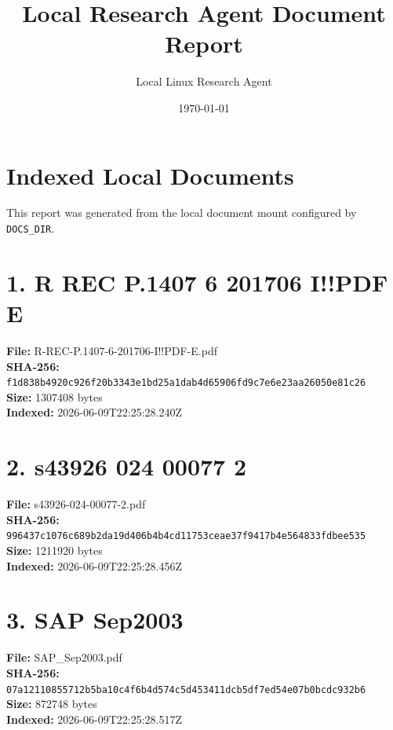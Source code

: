 \documentclass[11pt,a4paper]{article}
\title{Local Research Agent Document Report}
\author{Local Linux Research Agent}
\date{\today}
\begin{document}
\maketitle

\section*{Indexed Local Documents}
This report was generated from the local document mount configured by \texttt{DOCS\_DIR}.

\section*{1. R REC P.1407 6 201706 I!!PDF E}
\textbf{File:} R-REC-P.1407-6-201706-I!!PDF-E.pdf\\
\textbf{SHA-256:} \texttt{f1d838b4920c926f20b3343e1bd25a1dab4d65906fd9c7e6e23aa26050e81c26}\\
\textbf{Size:} 1307408 bytes\\
\textbf{Indexed:} 2026-06-09T22:25:28.240Z

\section*{2. s43926 024 00077 2}
\textbf{File:} s43926-024-00077-2.pdf\\
\textbf{SHA-256:} \texttt{996437c1076c689b2da19d406b4b4cd11753ceae37f9417b4e564833fdbee535}\\
\textbf{Size:} 1211920 bytes\\
\textbf{Indexed:} 2026-06-09T22:25:28.456Z

\section*{3. SAP Sep2003}
\textbf{File:} SAP\_Sep2003.pdf\\
\textbf{SHA-256:} \texttt{07a12110855712b5ba10c4f6b4d574c5d453411dcb5df7ed54e07b0bcdc932b6}\\
\textbf{Size:} 872748 bytes\\
\textbf{Indexed:} 2026-06-09T22:25:28.517Z
\end{document}
